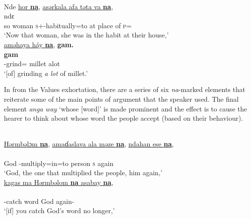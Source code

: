 \ea \label{ex:11:46}\\
Nde  \uline{hor  \textbf{na}},  \uline{asərkala  afa  təta  va  \textbf{na}},\\
\gll  ndɛ             \\ 
      so woman {\PSP} \textsc{s}+{\PFV}-{habitually}=to {at place of} \textsc{p}={\PRF} {\PSP}\\ 
\glt ‘Now that woman, she was in the habit at their house,’\\      
      
      \medskip
\underline{aməhaya  háy  \textbf{na}},  \textbf{gam.}\\      
\gll {}    \textbf{gam}\\
     {\DEP}-grind={\PLU}  millet {\PSP} alot\\
\glt  ‘[of] grinding \textit{a lot} of millet.’  
\z

In  from the Values exhortation, there are a series of six \textit{na}-marked elements that reiterate some of the main points of argument that the speaker used. The final element \textit{anga way} ‘whose [word]’ is made prominent and the effect is to cause the hearer to think about whose word the people accept (based on their behaviour). 

\ea \label{ex:11:47}\\
\underline{Hərmbəlɔm  \textbf{na}},  \underline{amaɗaslava  ala  məze  \textbf{na}},  \underline{ndahan  ese  \textbf{na}},\\    
\gll  {}                        \\  
      God  {\PSP}    {\DEP}-multiply=in=to  person  {\PSP}  \textsc{s}  again  {\PSP}\\  
\glt ‘God, the one that multiplied the people, him again,’ \\

\medskip
\underline{kagas  ma  Hərmbəlom  \textbf{na}  asabay  \textbf{na}},\\
\gll {}       \\
     {\twoS}-catch  word God  {\PSP} again-{\NEG}   {\PSP}  \\
\glt ‘[if] you catch God's word no longer,’\\


